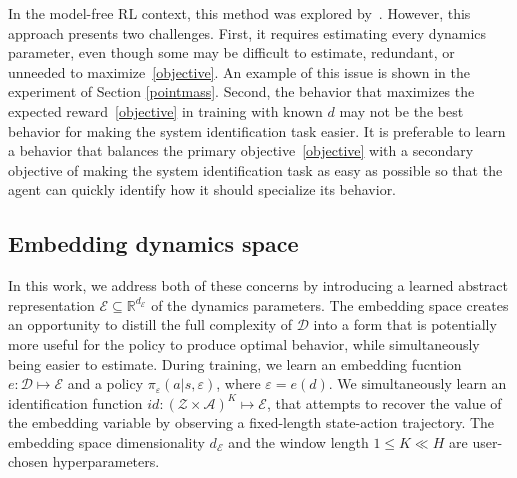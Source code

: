 \documentclass{article}
\newcommand{\R}{\mathbb{R}}
\newcommand{\cA}{\mathcal{A}}
\newcommand{\sysid}{dynamics}
\newcommand{\embedfn}{e}
\newcommand{\idfn}{id}
\newcommand{\obset}{\mathcal{Z}}
\newcommand{\idset}{\mathcal{D}}
\newcommand{\idvar}{d}
\newcommand{\latset}{\mathcal{E}}
\newcommand{\latvar}{\varepsilon}
\newcommand{\secref}[1]{Section \ref{#1}}
\begin{document}
In the model-free RL context, this method was explored by~\citet{yu-up-osi-rss17}.
However, this approach presents two challenges.
First, it requires estimating every \sysid{} parameter,
even though some may be difficult to estimate, redundant, or unneeded to maximize~\eqref{objective}.
An example of this issue is shown in the experiment of \secref{pointmass}.
Second, the behavior that maximizes the expected reward~\eqref{objective}
in training with known $\idvar$ may not be the best behavior for making the system identification task easier.
It is preferable to learn a behavior that balances the primary objective~\eqref{objective}
with a secondary objective of making the system identification task as easy as possible so that the agent can quickly identify how it should specialize its behavior.

\subsection{Embedding \sysid{} space}
In this work, we address both of these concerns by introducing
a learned abstract representation
$\latset \subseteq \R^{d_\latset}$
of the \sysid{} parameters.
The embedding space creates an opportunity to distill the full complexity of $\idset$
into a form that is potentially more useful for the policy to produce optimal behavior,
while simultaneously being easier to estimate.
During training, we learn an embedding fucntion $\embedfn : \idset \mapsto \latset$
and a policy $\pi_\latvar(a|s,\latvar)$, where $\latvar = \embedfn(\idvar)$.
We simultaneously learn an identification function $\idfn : (\obset \times \cA)^K \mapsto \latset$,
that attempts to recover the value of the embedding variable by observing a fixed-length state-action trajectory.
The embedding space dimensionality $d_\latset$ and the window length $1 \leq K \ll H$ are user-chosen hyperparameters.
\end{document}
